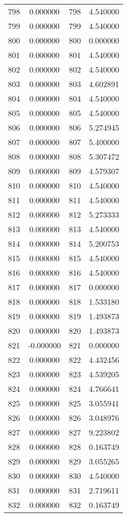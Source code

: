 \documentclass[12pt]{article}
\begin{document}
\begin{longtable}{@{}cccc@{}}
798 & 0.000000 & 798 & 4.540000 \\
799 & 0.000000 & 799 & 4.540000 \\
800 & 0.000000 & 800 & 0.000000 \\
801 & 0.000000 & 801 & 4.540000 \\
802 & 0.000000 & 802 & 4.540000 \\
803 & 0.000000 & 803 & 4.602891 \\
804 & 0.000000 & 804 & 4.540000 \\
805 & 0.000000 & 805 & 4.540000 \\
806 & 0.000000 & 806 & 5.274945 \\
807 & 0.000000 & 807 & 5.400000 \\
808 & 0.000000 & 808 & 5.307472 \\
809 & 0.000000 & 809 & 4.579307 \\
810 & 0.000000 & 810 & 4.540000 \\
811 & 0.000000 & 811 & 4.540000 \\
812 & 0.000000 & 812 & 5.273333 \\
813 & 0.000000 & 813 & 4.540000 \\
814 & 0.000000 & 814 & 5.200753 \\
815 & 0.000000 & 815 & 4.540000 \\
816 & 0.000000 & 816 & 4.540000 \\
817 & 0.000000 & 817 & 0.000000 \\
818 & 0.000000 & 818 & 1.533180 \\
819 & 0.000000 & 819 & 1.493873 \\
820 & 0.000000 & 820 & 1.493873 \\
821 & -0.000000 & 821 & 0.000000 \\
822 & 0.000000 & 822 & 4.432456 \\
823 & 0.000000 & 823 & 4.539205 \\
824 & 0.000000 & 824 & 4.766641 \\
825 & 0.000000 & 825 & 3.055941 \\
826 & 0.000000 & 826 & 3.048976 \\
827 & 0.000000 & 827 & 9.223802 \\
828 & 0.000000 & 828 & 0.163749 \\
829 & 0.000000 & 829 & 3.055265 \\
830 & 0.000000 & 830 & 4.540000 \\
831 & 0.000000 & 831 & 2.719611 \\
832 & 0.000000 & 832 & 0.163749 \\

\end{longtable}
\end{document}
